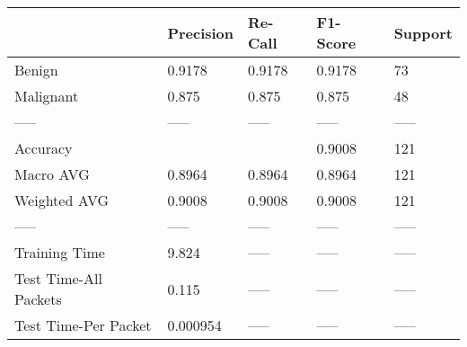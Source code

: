 \begin{tabular}{lllll}
\toprule
{} & Precision & Re-Call & F1-Score & Support \\
\midrule
Benign                &    0.9178 &  0.9178 &   0.9178 &      73 \\
Malignant             &     0.875 &   0.875 &    0.875 &      48 \\
-----                 &     ----- &   ----- &    ----- &   ----- \\
Accuracy              &           &         &   0.9008 &     121 \\
Macro AVG             &    0.8964 &  0.8964 &   0.8964 &     121 \\
Weighted AVG          &    0.9008 &  0.9008 &   0.9008 &     121 \\
-----                 &     ----- &   ----- &    ----- &   ----- \\
Training Time         &     9.824 &   ----- &    ----- &   ----- \\
Test Time-All Packets &     0.115 &   ----- &    ----- &   ----- \\
Test Time-Per Packet  &  0.000954 &   ----- &    ----- &   ----- \\
\bottomrule
\end{tabular}
